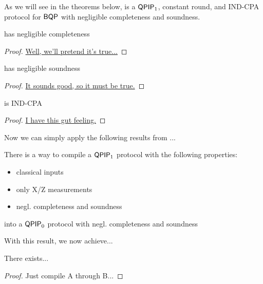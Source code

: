 As we will see in the theorems below,  is a $\operatorname{\mathsf{QPIP}}_1$, constant round, and IND-CPA protocol for $\operatorname{\mathsf{BQP}}$ with negligible completeness and soundness.

\begin{thm}
	 has negligible completeness
\end{thm}
\begin{proof}
	\href{http://jwilson.coe.uga.edu/EMT668/EMAT6680.F99/Challen/proof/proof.html}{Well, we'll pretend it's true...}
\end{proof}

\begin{thm}
	 has negligible soundness
\end{thm}
\begin{proof}
	\href{http://jwilson.coe.uga.edu/EMT668/EMAT6680.F99/Challen/proof/proof.html}{It sounds good, so it must be true.}
\end{proof}

\begin{thm}
	 is IND-CPA
\end{thm}
\begin{proof}
	\href{http://jwilson.coe.uga.edu/EMT668/EMAT6680.F99/Challen/proof/proof.html}{I have this gut feeling.}
\end{proof}

Now we can simply apply the following results from ...

\begin{thm}
	There is a way to compile a $\operatorname{\mathsf{QPIP}}_1$ protocol with the following properties:
	\begin{itemize}
		\item classical inputs
		\item only X/Z measurements
		\item negl. completeness and soundness
	\end{itemize}
	into a $\operatorname{\mathsf{QPIP}}_0$ protocol with negl. completeness and soundness
\end{thm}

With this result, we now achieve...
\begin{thm}
	There exists...
\end{thm}
\begin{proof}
	Just compile A through B...
\end{proof}

